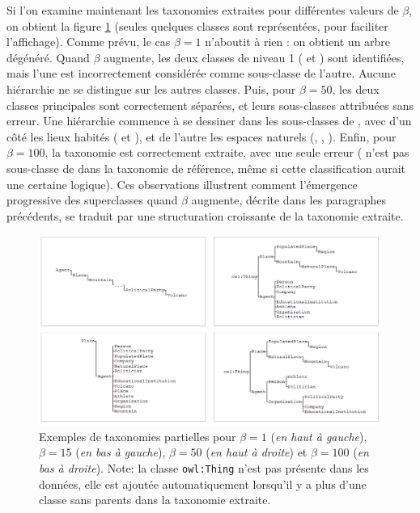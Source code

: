 Si l'on examine maintenant les taxonomies extraites pour différentes valeurs de $\beta$, on obtient la figure \ref{fig:hp-beta-taxonomies} (seules quelques classes sont représentées, pour faciliter l'affichage). Comme prévu, le cas $\beta = 1$ n'aboutit à rien : on obtient un arbre dégénéré. Quand $\beta$ augmente, les deux classes de niveau 1 ( et ) sont identifiées, mais l'une est incorrectement considérée comme sous-classe de l'autre. Aucune hiérarchie ne se distingue sur les autres classes. Puis, pour $\beta=50$, les deux classes principales sont correctement séparées, et leurs sous-classes attribuées sans erreur. Une hiérarchie commence à se dessiner dans les sous-classes de , avec d'un côté les lieux habités ( et ), et de l'autre les espaces naturels (, , ). Enfin, pour $\beta=100$, la taxonomie est correctement extraite, avec une seule erreur ( n'est pas sous-classe de  dans la taxonomie de référence, même si cette classification aurait une certaine logique). Ces observations illustrent comment l'émergence progressive des superclasses quand $\beta$ augmente, décrite dans les paragraphes précédents, se traduit par une structuration croissante de la taxonomie extraite.

\begin{figure}[h]
    \centering
    \includegraphics[width=\textwidth]{img/tax_samples.png}
    \caption[Exemples de taxonomies partielles pour différentes valeurs de $\beta$]{Exemples de taxonomies partielles pour $\beta = 1$ (\textit{en haut à gauche}), $\beta = 15$ (\textit{en bas à gauche}), $\beta=50$ (\textit{en haut à droite}) et $\beta=100$ (\textit{en bas à droite}). \small Note: la classe \texttt{owl:Thing} n'est pas présente dans les données, elle est ajoutée automatiquement lorsqu'il y a plus d'une classe sans parents dans la taxonomie extraite.}
    \label{fig:hp-beta-taxonomies}
\end{figure}


